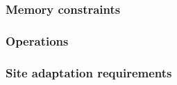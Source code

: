 \subsubsection{Memory constraints}

\subsubsection{Operations}

\subsubsection{Site adaptation requirements}

